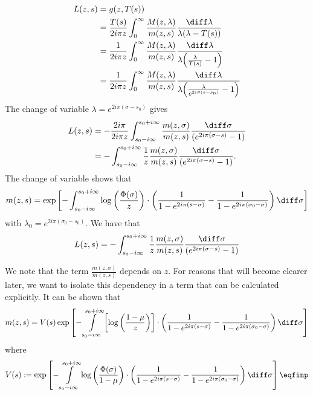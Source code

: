 \begin{align*}
    L(z,s) &= g(z,T(s)) \\ 
    &= 
    \frac{T(s)}{2i \pi z}\int_0^\infty  \frac{M(z,\lambda)}{m(z,s)} \frac{\diff \lambda}{\lambda(\lambda-T(s))} \\
    &= 
    \frac{1}{2i\pi z}\int_0^\infty  \frac{M(z,\lambda)}{m(z,s)} \frac{\diff \lambda}{\lambda\Big(\frac{\lambda}{T(s)}-1\Big)} \\
    &= 
    \frac{1}{2i\pi z}\int_0^\infty  \frac{M(z,\lambda)}{m(z,s)} \frac{\diff \lambda}{\lambda\Big(\frac{\lambda}{e^{2i\pi(s-s_0)}}-1\Big)} \\
\end{align*}
The change of variable $\lambda = e^{2i\pi(\sigma-s_0)}$ gives
\begin{align*}
    L(z,s)
    &= 
    - \frac{2i\pi }{2i\pi z}\int_{s_0-i\infty}^{s_0+i\infty}  \frac{m(z,\sigma)}{m(z,s)} \frac{\diff \sigma}{(e^{2i\pi(\sigma-s)}-1)} \\
    &= 
   - \int_{s_0-i\infty}^{s_0+i\infty} \frac{1}{z}  \frac{m(z,\sigma)}{m(z,s)} \frac{\diff \sigma}{(e^{2i\pi(\sigma-s)}-1)}. 
\end{align*}
The change of variable shows that
\begin{equation}
    m(z,s) = \exp \left[
    - \int_{s_0-i\infty}^{s_0+i\infty}\log \left( \frac{\Phi(
    \sigma)}{z}\right)
    \cdot \left(
        \frac{1}{1-e^{2i\pi(s-\sigma)}} - \frac{1}{1-e^{2i\pi(\sigma_0-\sigma)}}
     \right) \diff \sigma
    \right]
\end{equation} 
with $\lambda_0 = e^{2i\pi(\sigma_0 - s_0)}$. 
We have that 
\begin{equation}
    L(z,s) 
    = 
   - \int_{s_0-i\infty}^{s_0+i\infty} \frac{1}{z}  \frac{m(z,\sigma)}{m(z,s)} \frac{\diff \sigma}{(e^{2i\pi(\sigma-s)}-1)}
\end{equation}

We note that the term $\frac{m(z,\sigma)}{m(z,s)}$ depends on $z$. For reasons that will become clearer later, we want to isolate this dependency in a term that can be calculated explicitly. 
It can be shown that 
\begin{equation}
    m(z,s) = V(s)
    \exp \left[
    - \int\limits_{s_0-i\infty}^{s_0+i\infty} \left[\log \left( \frac{1-\mu}{z}\right)\right]
    \cdot \left(
        \frac{1}{1-e^{2i\pi(s-\sigma)}} - \frac{1}{1-e^{2i\pi(\sigma_0-\sigma)}}
     \right) \diff \sigma
    \right]
    \label{eq:uselogbranch}
\end{equation}
where 
\begin{equation}
V(s) := \exp \left[
    - \int\limits_{s_0-i\infty}^{s_0+i\infty}\log \left( \frac{\Phi(\sigma)}{1-\mu}\right)
    \cdot \left(
        \frac{1}{1-e^{2i\pi(s-\sigma)}} - \frac{1}{1-e^{2i\pi(\sigma_0-\sigma)}}
     \right) \diff \sigma 
    \right]
    \label{def:V}
    \eqfinp
\end{equation}

